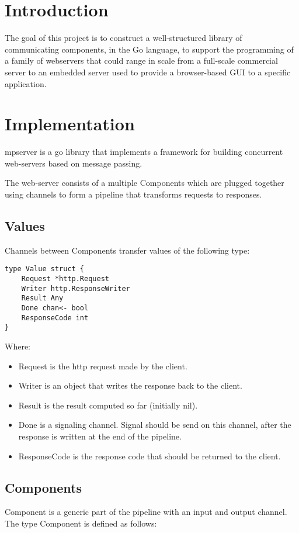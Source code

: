 \documentclass[12pt,a4paper]{article}
\begin{document}
\section{Introduction}
The goal of this project is to construct a well-structured
library of communicating components, in the Go language, to support
the programming of a family of webservers that could range in scale from a full-scale commercial server to an embedded server used to provide a browser-based GUI to a specific application.

\section{Implementation}

mpserver is a go library that implements a framework for building 
concurrent web-servers based on message passing.

The web-server consists of a multiple Components which are plugged 
together using channels to form a pipeline that transforms requests 
to responses.

\subsection{Values} 
Channels between Components transfer values of the following type:

\begin{lstlisting}
type Value struct {
    Request *http.Request
    Writer http.ResponseWriter
    Result Any
    Done chan<- bool
    ResponseCode int
}
\end{lstlisting}
Where:
\begin{itemize}
  \item Request is the http request made by the client.
  \item Writer is an object that writes the response back to the 	client.
  \item Result is the result computed so far (initially nil).
  \item Done is a signaling channel. Signal should be send on this channel,
		after the response is written at the end of the pipeline.
  \item ResponseCode is the response code that should be returned to the client.
\end{itemize}

\subsection{Components}
Component is a generic part of the pipeline with an input and output channel.
The type Component is defined as follows:
\end{document}
